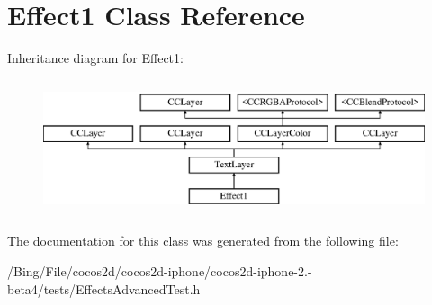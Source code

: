 \hypertarget{interface_effect1}{\section{Effect1 Class Reference}
\label{interface_effect1}
}
Inheritance diagram for Effect1\-:\begin{figure}[H]
\begin{center}
\leavevmode
\includegraphics[height=4.000000cm]{interface_effect1}
\end{center}
\end{figure}


The documentation for this class was generated from the following file\-:\begin{DoxyCompactItemize}
\item 
/\-Bing/\-File/cocos2d/cocos2d-\/iphone/cocos2d-\/iphone-\/2.-\/beta4/tests/Effects\-Advanced\-Test.\-h\end{DoxyCompactItemize}
